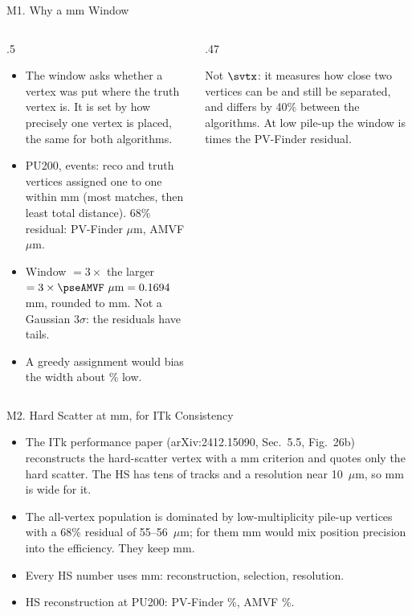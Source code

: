 
\begin{frame}{M1. Why a \winMM{} mm Window}
\small
\begin{columns}[T]
\begin{column}{.5\linewidth}\footnotesize
\begin{itemize}\setlength\itemsep{.3em}
\item The window asks whether a vertex was put where the truth vertex is. It is set by how precisely one vertex is placed, the same for both algorithms.
\item PU200, \nEvtPU{} events: reco and truth vertices assigned one to one within \assignMM{} mm (most matches, then least total distance). 68\% residual: PV-Finder \pseVsix{} $\mu$m, AMVF \pseAMVF{} $\mu$m.
\item Window $=3\times$ the larger $=3\times\pseAMVF~\mu\mathrm{m}=0.1694$ mm, rounded to \winMM{} mm. Not a Gaussian $3\sigma$: the residuals have tails.
\item A greedy assignment would bias the width about \greedyBias\% low.
\end{itemize}
\end{column}
\begin{column}{.47\linewidth}\centering
{}
\par\vspace{.3em}
{\footnotesize Not $\svtx$: it measures how close two vertices can be and still be separated, and differs by 40\% between the algorithms. At low pile-up the window is \lpWinRatio{} times the PV-Finder residual.}
\end{column}
\end{columns}
\end{frame}

\begin{frame}{M2. Hard Scatter at \hsWinMM{} mm, for ITk Consistency}
\small
\begin{itemize}\setlength\itemsep{.5em}
\item The ITk performance paper (arXiv:2412.15090, Sec.~5.5, Fig.~26b) reconstructs the hard-scatter vertex with a \hsWinMM{} mm criterion and quotes only the hard scatter. The HS has tens of tracks and a resolution near 10~$\mu$m, so \hsWinMM{} mm is wide for it.
\item The all-vertex population is dominated by low-multiplicity pile-up vertices with a 68\% residual of 55--56~$\mu$m; for them \hsWinMM{} mm would mix position precision into the efficiency. They keep \winMM{} mm.
\item Every HS number uses \hsWinMM{} mm: reconstruction, selection, resolution.
\item HS reconstruction at PU200: PV-Finder \hsRecoPVF\%, AMVF \hsRecoAMVF\%.
\end{itemize}
\end{frame}

